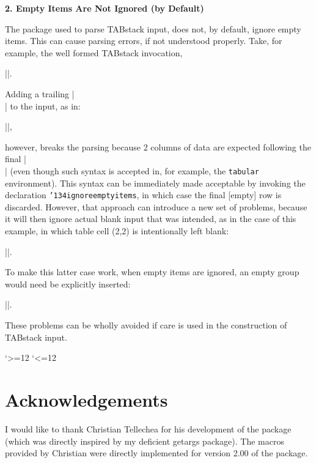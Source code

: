 \documentclass{article}
\newcommand\cmd[1]{\texttt{\char'134#1}}
\def\endvbdelim{\catcode`>=12 \catcode`<=12 }
\begin{document}
{\textbf{2. Empty Items Are Not Ignored (by Default)}

The \loi{} package used to parse TABstack input, does not, by default,
  ignore empty items.
This can cause parsing errors, if not understood properly. 
Take, for example, the well formed TABstack invocation,

\vb||.

Adding a trailing \vb|\\| to the input, as in:

\vb||,

however, breaks the parsing because 2 columns of data are expected
  following the final \vb|\\| (even though such syntax is accepted
  in, for example, the \texttt{tabular} environment).
This syntax can be immediately made acceptable by
  invoking the \loi{} declaration \cmd{ignoreemptyitems}, in which case
  the final [empty] row is discarded.
However, that approach can introduce a new set of problems, because 
  it will then ignore actual blank input that was intended, as in the
  case of this example, in which table cell (2,2) is intentionally
  left blank:

\vb||.

To make this latter case work, when empty items are ignored, an
   empty group would need be explicitly inserted:

\vb||.

These problems can be wholly avoided if care is used in the
  construction of TABstack input.

\endvbdelim
\section*{Acknowledgements}

I would like to thank Christian Tellechea for his development of the 
  \loi{} package (which was directly inspired by my deficient
  \textsf{getargs} package).
The macros provided by Christian were directly implemented for version 2.00
  of the \tst{} package.

}
\end{document}
